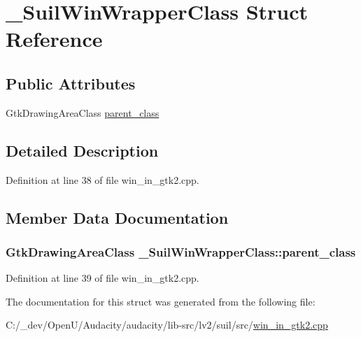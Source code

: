 \hypertarget{struct___suil_win_wrapper_class}{}\section{\+\_\+\+Suil\+Win\+Wrapper\+Class Struct Reference}
\label{struct___suil_win_wrapper_class}
\subsection*{Public Attributes}
\begin{DoxyCompactItemize}
\item 
Gtk\+Drawing\+Area\+Class \hyperlink{struct___suil_win_wrapper_class_adcf2fc38d4a1ee317aa4f5384c335037}{parent\+\_\+class}
\end{DoxyCompactItemize}


\subsection{Detailed Description}


Definition at line 38 of file win\+\_\+in\+\_\+gtk2.\+cpp.



\subsection{Member Data Documentation}
\subsubsection[{\texorpdfstring{parent\+\_\+class}{parent_class}}]{\setlength{\rightskip}{0pt plus 5cm}Gtk\+Drawing\+Area\+Class \+\_\+\+Suil\+Win\+Wrapper\+Class\+::parent\+\_\+class}\hypertarget{struct___suil_win_wrapper_class_adcf2fc38d4a1ee317aa4f5384c335037}{}\label{struct___suil_win_wrapper_class_adcf2fc38d4a1ee317aa4f5384c335037}


Definition at line 39 of file win\+\_\+in\+\_\+gtk2.\+cpp.



The documentation for this struct was generated from the following file\+:\begin{DoxyCompactItemize}
\item 
C\+:/\+\_\+dev/\+Open\+U/\+Audacity/audacity/lib-\/src/lv2/suil/src/\hyperlink{win__in__gtk2_8cpp}{win\+\_\+in\+\_\+gtk2.\+cpp}\end{DoxyCompactItemize}
